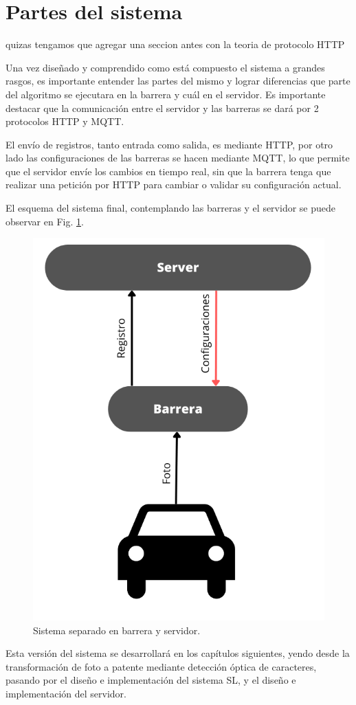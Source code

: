 \section{Partes del sistema}

 {\huge quizas tengamos que agregar una seccion antes con la teoria de protocolo HTTP}

Una vez diseñado y comprendido como está compuesto el sistema a grandes rasgos, es importante entender las partes del mismo y lograr diferencias que parte del algoritmo se ejecutara en la barrera y cuál en el servidor. Es importante destacar que la comunicación entre el servidor y las barreras se dará por 2 protocolos HTTP y MQTT.

El envío de registros, tanto entrada como salida, es mediante HTTP, por otro lado las configuraciones de las barreras se hacen mediante MQTT, lo que permite que el servidor envíe los cambios en tiempo real, sin que la barrera tenga que realizar una petición por HTTP para cambiar o validar su configuración actual.

El esquema del sistema final, contemplando las barreras y el servidor se puede observar en Fig. \ref{fig:sistema-server-barrera}.

\begin{figure}[h]
    \centering
    \includegraphics[width=.4\textwidth]{imgs/sistema-server-barrera}
    \caption{Sistema separado en barrera y servidor.}
    \label{fig:sistema-server-barrera}
\end{figure}

Esta versión del sistema se desarrollará en los capítulos siguientes, yendo desde la transformación de foto a patente mediante detección óptica de caracteres, pasando por el diseño e implementación del sistema SL, y el diseño e implementación del servidor.